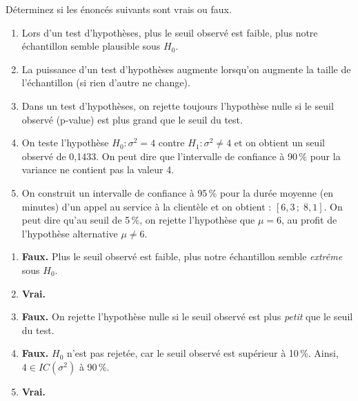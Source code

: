 \begin{exercice}
Déterminez si les énoncés suivants sont vrais ou faux.
\begin{enumerate}[label=(\alph*)]
  \item Lors d'un test d'hypothèses, plus le seuil observé est faible, plus notre
  échantillon semble plausible sous $H_0$.
  \item La puissance d'un test d'hypothèses augmente lorsqu'on augmente la taille de
  l'échantillon (si rien d'autre ne change).
  \item Dans un test d'hypothèses, on rejette toujours l'hypothèse nulle si le seuil observé
  (p-value) est plus grand que le seuil du test.
  \item On teste l'hypothèse $H_0:\sigma^2=4$ contre $H_1:\sigma^2\neq 4$ et on obtient un
  seuil observé de 0,1433. On peut dire que l'intervalle de confiance à 90\,\% pour la
  variance ne contient pas la valeur 4.
  \item On construit un intervalle de confiance à 95\,\% pour la durée moyenne (en minutes)
  d'un appel au service à la clientèle et on obtient : $[6,3\,;\;8,1]$. On peut dire qu'au
  seuil de 5\,\%, on rejette l'hypothèse que $\mu=6$, au profit de l'hypothèse alternative
  $\mu\neq 6$.
\end{enumerate}
\begin{solution}
\begin{enumerate}[label=(\alph*)]
  \item \textbf{Faux.} Plus le seuil observé est faible, plus notre échantillon semble
  \emph{extrême} sous $H_0$.
  \item \textbf{Vrai.}
  \item \textbf{Faux.} On rejette l'hypothèse nulle si le seuil observé est plus
  \emph{petit} que le seuil du test.
  \item \textbf{Faux.} $H_0$ n'est pas rejetée, car le seuil observé est supérieur à
  10\,\%. Ainsi, $4\in IC(\sigma^2)$ à 90\,\%.
  \item \textbf{Vrai.}
\end{enumerate}
\end{solution}
\end{exercice}


